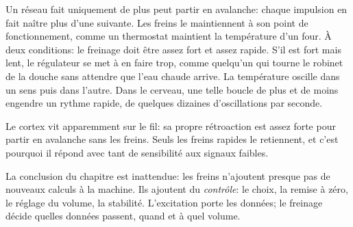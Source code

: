 Un réseau fait uniquement de \og plus\fg{} peut partir en avalanche: chaque impulsion en fait naître plus d'une suivante. Les freins le maintiennent à son point de fonctionnement, comme un thermostat maintient la température d'un four. À deux conditions: le freinage doit être assez fort et assez rapide. S'il est fort mais lent, le régulateur se met à en faire trop, comme quelqu'un qui tourne le robinet de la douche sans attendre que l'eau chaude arrive. La température oscille dans un sens puis dans l'autre. Dans le cerveau, une telle boucle de \og plus\fg{} et de \og moins\fg{} engendre un rythme rapide, de quelques dizaines d'oscillations par seconde.

Le cortex vit apparemment sur le fil: sa propre rétroaction est assez forte pour partir en avalanche sans les freins. Seuls les freins rapides le retiennent, et c'est pourquoi il répond avec tant de sensibilité aux signaux faibles.

La conclusion du chapitre est inattendue: les freins n'ajoutent presque pas de nouveaux calculs à la machine. Ils ajoutent du \emph{contrôle}: le choix, la remise à zéro, le réglage du volume, la stabilité. L'excitation porte les données; le freinage décide quelles données passent, quand et à quel volume.

